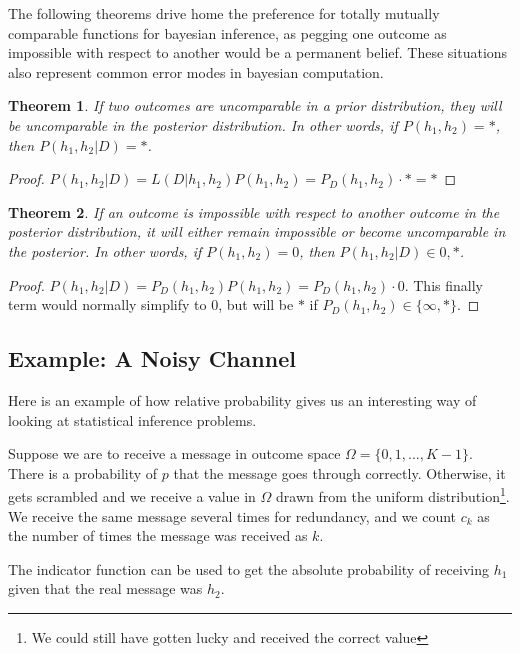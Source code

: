 \documentclass[twoside]{article}
\theoremstyle{plain}%
\newtheorem{theorem}{Theorem}[section]
\theoremstyle{definition}
\theoremstyle{remark}
\begin{document}
The following theorems drive home the preference for totally mutually comparable functions for bayesian inference, as pegging one outcome as impossible with respect to another would be a permanent belief. These situations also represent common error modes in bayesian computation.

\begin{theorem}
If two outcomes are uncomparable in a prior distribution, they will be uncomparable in the posterior distribution. In other words, if \(P(h_1, h_2)=\ast\), then \(P(h_1, h_2|D) = \ast\).
\end{theorem}

\begin{proof}
\(P(h_1, h_2|D) = L(D|h_1, h_2) P(h_1, h_2) = P_D(h_1, h_2) \cdot \ast = \ast\)
\end{proof}

\begin{theorem}
If an outcome is impossible with respect to another outcome in the posterior distribution, it will either remain impossible or become uncomparable in the posterior. In other words,  if \(P(h_1, h_2)=0\), then \(P(h_1, h_2|D) \in {0, \ast}\).
\end{theorem}

\begin{proof}
\(P(h_1, h_2|D) = P_D(h_1, h_2) P(h_1, h_2) = P_D(h_1, h_2) \cdot 0\). This finally term would normally simplify to 0, but will be \(\ast\) if \(P_D(h_1, h_2) \in \{\infty, \ast\}\).
\end{proof}

\subsection{Example: A Noisy Channel}

Here is an example of how relative probability gives us an interesting way of looking at statistical inference problems.

Suppose we are to receive a message in outcome space \(\Omega = \{0, 1, ..., K-1\}\). There is a probability of \(p\) that the message goes through correctly. Otherwise, it gets scrambled and we receive a value in \(\Omega\) drawn from the uniform distribution\footnote{We could still have gotten lucky and received the correct value}. We receive the same message several times for redundancy, and we count \(c_k\) as the number of times the message was received as \(k\).

The indicator function can be used to get the absolute probability of receiving \(h_1\) given that the real message was \(h_2\).
\end{document}
